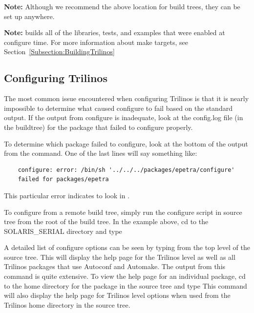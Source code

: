 {\bf Note:} Although we recommend the above location for build trees,
they can be set up anywhere.

{\bf Note:}  builds all of the libraries, tests,
and examples that were enabled at configure time.  For more information about
make targets, see Section~\ref{Subsection:BuildingTrilinos}

\subsection{Configuring Trilinos}
\label{Subsection:ConfiguringTrilinos}

\begin{minipage}[c]{\textwidth}

\begin{minipage}[l]{.6\textwidth}

The most common issue encountered when configuring Trilinos is that it is
nearly impossible to determine what caused configure to fail based on the
standard output.  If the output from configure is inadequate,
look at the config.log file (in the buildtree)
for the package that failed to configure properly.

\end{minipage}\hfill
{}
\end{minipage}

To determine which
package failed to configure, look at the bottom of the output from the
 command.  One of the last lines will say something
like:

\begin{verbatim}
    configure: error: /bin/sh '../../../packages/epetra/configure'
    failed for packages/epetra
\end{verbatim}

This particular error indicates to look in
.

	To configure from a remote build tree, simply run the configure script
in source tree from the root of the build tree.  In the example above, cd to
the SOLARIS\_SERIAL directory and type

A detailed list of configure options can be seen by typing
 from the top level of the
source tree.  This will display the help page for the Trilinos level as well as all
Trilinos packages that use Autoconf and Automake.  The output from this command
is quite extensive.  To view the help page for an individual package, cd to
the home directory for the package in the source tree and type
This command will also display the help page for Trilinos level
options when used from the Trilinos home directory in the source tree.


